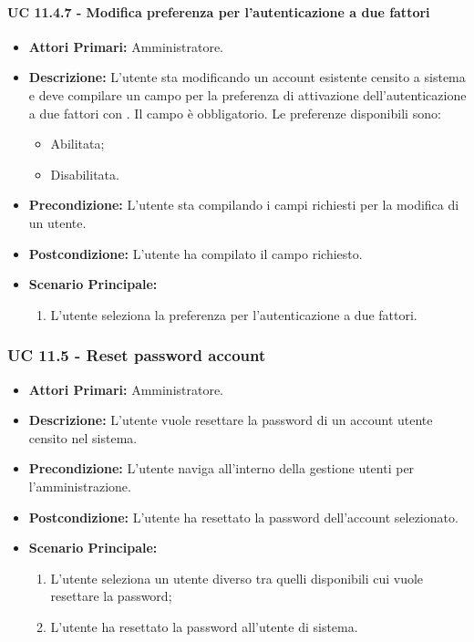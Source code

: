 				\paragraph{UC 11.4.7 - Modifica preferenza per l'autenticazione a due fattori}
				\begin{itemize}
					\item \textbf{Attori Primari:} Amministratore.
					\item \textbf{Descrizione:} L'utente sta modificando un account esistente censito a sistema e deve compilare un campo per la preferenza di attivazione dell'autenticazione a due fattori con . Il campo è obbligatorio. Le preferenze disponibili sono:
					\begin{itemize}
						\item Abilitata;
						\item Disabilitata.
					\end{itemize}
					\item \textbf{Precondizione:} L'utente sta compilando i campi richiesti per la modifica di un utente.
					\item \textbf{Postcondizione:} L'utente ha compilato il campo richiesto.
					\item \textbf{Scenario Principale:}
					\begin{enumerate}
						\item{L'utente seleziona la preferenza per l'autenticazione a due fattori.}
					\end{enumerate}	
				\end{itemize}



			\subsubsection{UC 11.5 - Reset password account}
			\begin{itemize}
				\item \textbf{Attori Primari:} Amministratore.
				\item \textbf{Descrizione:} L'utente vuole resettare la password di un account utente censito nel sistema.
				\item \textbf{Precondizione:} L'utente naviga all'interno della gestione utenti per l'amministrazione.
				\item \textbf{Postcondizione:} L'utente ha resettato la password dell'account selezionato.
				\item \textbf{Scenario Principale:}
				\begin{enumerate}
					\item{L'utente seleziona un utente diverso tra quelli disponibili cui vuole resettare la password;}
					\item{L'utente ha resettato la password all'utente di sistema.}
				\end{enumerate}		
			\end{itemize}

